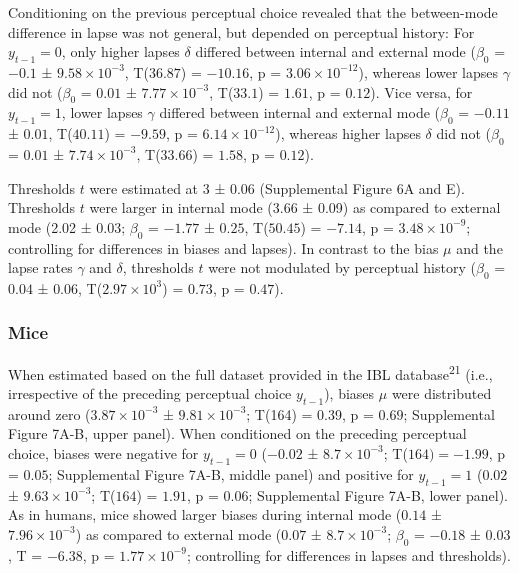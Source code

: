 \documentclass[
]{article}
\begin{document}
Conditioning on the previous perceptual choice revealed that the
between-mode difference in lapse was not general, but depended on
perceptual history: For \(y_{t-1} = 0\), only higher lapses \(\delta\)
differed between internal and external mode (\(\beta_0\) = \(-0.1\) ±
\(\ensuremath{9.58\times 10^{-3}}\), T(\(36.87\)) = \(-10.16\), p =
\(\ensuremath{3.06\times 10^{-12}}\)), whereas lower lapses \(\gamma\)
did not (\(\beta_0\) = \(0.01\) ± \(\ensuremath{7.77\times 10^{-3}}\),
T(\(33.1\)) = \(1.61\), p = \(0.12\)). Vice versa, for \(y_{t-1} = 1\),
lower lapses \(\gamma\) differed between internal and external mode
(\(\beta_0\) = \(-0.11\) ± \(0.01\), T(\(40.11\)) = \(-9.59\), p =
\(\ensuremath{6.14\times 10^{-12}}\)), whereas higher lapses \(\delta\)
did not (\(\beta_0\) = \(0.01\) ± \(\ensuremath{7.74\times 10^{-3}}\),
T(\(33.66\)) = \(1.58\), p = \(0.12\)).

Thresholds \(t\) were estimated at 3 ± 0.06 (Supplemental Figure 6A and
E). Thresholds \(t\) were larger in internal mode (3.66 ± 0.09) as
compared to external mode (2.02 ± 0.03; \(\beta_0\) = \(-1.77\) ±
\(0.25\), T(\(50.45\)) = \(-7.14\), p =
\(\ensuremath{3.48\times 10^{-9}}\); controlling for differences in
biases and lapses). In contrast to the bias \(\mu\) and the lapse rates
\(\gamma\) and \(\delta\), thresholds \(t\) were not modulated by
perceptual history (\(\beta_0\) = \(0.04\) ± \(0.06\),
T(\(\ensuremath{2.97\times 10^{3}}\)) = \(0.73\), p = \(0.47\)).

\hypertarget{mice}{%
\subsubsection{Mice}\label{mice}}

When estimated based on the full dataset provided in the IBL
database\textsuperscript{21} (i.e., irrespective of the preceding
perceptual choice \(y_{t-1}\)), biases \(\mu\) were distributed around
zero (\(\ensuremath{3.87\times 10^{-3}}\) ±
\(\ensuremath{9.81\times 10^{-3}}\); T(164) = 0.39, p = \(0.69\);
Supplemental Figure 7A-B, upper panel). When conditioned on the
preceding perceptual choice, biases were negative for \(y_{t-1} = 0\)
(\(-0.02\) ± \(\ensuremath{8.7\times 10^{-3}}\); T(\(164) = -1.99\), p =
\(0.05\); Supplemental Figure 7A-B, middle panel) and positive for
\(y_{t-1} = 1\) (\(0.02\) ± \(\ensuremath{9.63\times 10^{-3}}\);
T(\(164\)) = \(1.91\), p = \(0.06\); Supplemental Figure 7A-B, lower
panel). As in humans, mice showed larger biases during internal mode
(\(0.14\) ± \(\ensuremath{7.96\times 10^{-3}}\)) as compared to external
mode (\(0.07\) ± \(\ensuremath{8.7\times 10^{-3}}\); \(\beta_0\) =
\(-0.18\) ± \(0.03\), T = \(-6.38\), p =
\(\ensuremath{1.77\times 10^{-9}}\); controlling for differences in
lapses and thresholds).
\end{document}
